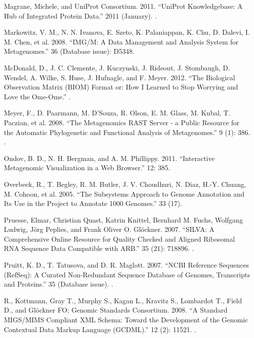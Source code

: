 \documentclass[letterpaper,10pt,english]{sphinxmanual}
\begin{document}
Magrane, Michele, and UniProt Consortium. 2011. “UniProt
Knowledgebase: A Hub of Integrated Protein Data.”  2011 (January).
.

Markowitz, V. M., N. N. Ivanova, E. Szeto, K. Palaniappan, K. Chu,
D. Dalevi, I. M. Chen, et al. 2008. “IMG/M: A Data Management and
Analysis System for Metagenomes.”  36 (Database
issue): D534\textendash{}8.

McDonald, D., J. C. Clemente, J. Kuczynski, J. Rideout, J.
Stombaugh, D. Wendel, A. Wilke, S. Huse, J. Hufnagle, and F.
Meyer. 2012. “The Biological Observation Matrix (BIOM) Format or:
How I Learned to Stop Worrying and Love the Ome-Ome.”
.

Meyer, F., D. Paarmann, M. D’Souza, R. Olson, E. M. Glass, M.
Kubal, T. Paczian, et al. 2008. “The Metagenomics RAST Server - a
Public Resource for the Automatic Phylogenetic and Functional
Analysis of Metagenomes.”  9 (1): 386.
.

Ondov, B. D., N. H. Bergman, and A. M. Phillippy. 2011.
“Interactive Metagenomic Visualization in a Web Browser.”  12: 385.

Overbeek, R., T. Begley, R. M. Butler, J. V. Choudhuri, N. Diaz,
H.-Y. Chuang, M. Cohoon, et al. 2005. “The Subsystems Approach to
Genome Annotation and Its Use in the Project to Annotate 1000
Genomes.”  33 (17).

Pruesse, Elmar, Christian Quast, Katrin Knittel, Bernhard M.
Fuchs, Wolfgang Ludwig, Jörg Peplies, and Frank Oliver O.
Glöckner. 2007. “SILVA: A Comprehensive Online Resource for
Quality Checked and Aligned Ribosomal RNA Sequence Data Compatible
with ARB.”  35 (21): 7188\textendash{}96.
.

Pruitt, K. D., T. Tatusova, and D. R. Maglott. 2007. “NCBI
Reference Sequences (RefSeq): A Curated Non-Redundant Sequence
Database of Genomes, Transcripts and Proteins.”  35 (Database issue).
.

R., Kottmann, Gray T., Murphy S., Kagan L., Kravitz S., Lombardot
T., Field D., and Glöckner FO; Genomic Standards Consortium. 2008.
“A Standard MIGS/MIMS Compliant XML Schema: Toward the Development
of the Genomic Contextual Data Markup Language (GCDML).” 
12 (2): 115\textendash{}21. .
\end{document}
